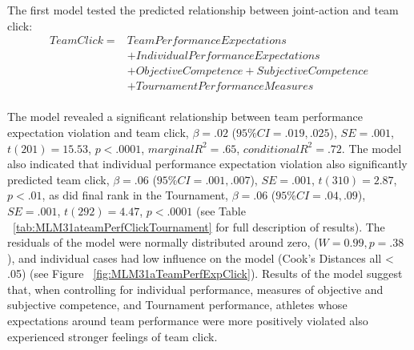 \documentclass[12pt]{report}
\begin{document}
{The first model tested the predicted relationship between joint-action and team click:
  \begin{equation}
    \begin{align*}
      Team Click =  & Team Performance Expectations  \\
                &+ Individual Performance Expectations   \\
                &+ Objective Competence + Subjective Competence \\
                &+ TournamentPerformanceMeasures  \\
    \end{align*}
  \end{equation}
  \bigskip

The model revealed a significant relationship between team performance expectation violation and team click, $\beta = .02$ ($95\% CI =  .019, .025$), $SE = .001$, $t(201) = 15.53$, $p < .0001$, $marginal R^2 = .65$, $conditional R^2 = .72$.  The model also indicated that individual performance expectation violation also significantly predicted team click, $\beta = .06$ ($95\% CI =  .001, .007$), $SE = .001$, $t(310) = 2.87$, $p < .01$, as did final rank in the Tournament, $\beta = .06$ ($95\% CI =  .04, .09$), $SE = .001$, $t(292) = 4.47$, $p < .0001$  (see Table ~\ref{tab:MLM31ateamPerfClickTournament} for full description of results).  The residuals of the model were normally distributed around zero, ($W = 0.99, p = .38$), and individual cases had low influence on the model (Cook's Distances all < .05) (see Figure ~\ref{fig:MLM31aTeamPerfExpClick}).  Results of the model suggest that, when controlling for individual performance, measures of objective and subjective competence, and Tournament performance, athletes whose expectations around team performance were more positively violated also experienced stronger feelings of team click.



}
\end{document}
